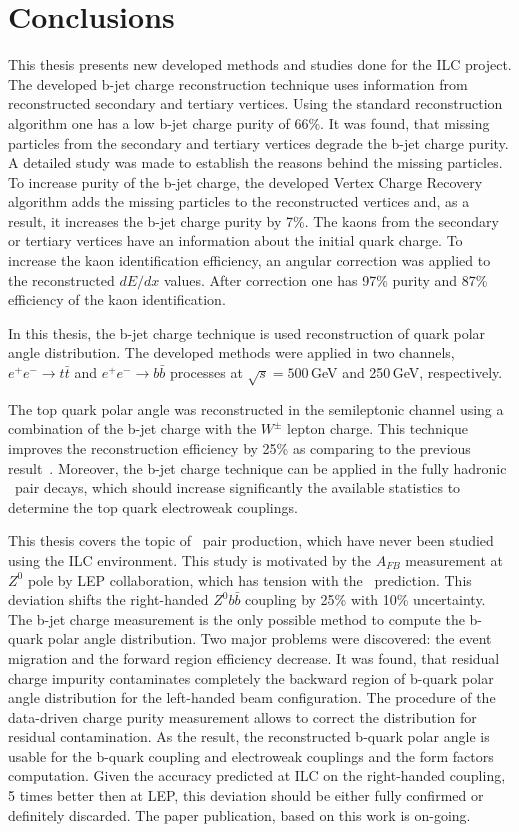 \section*{Conclusions}
This thesis presents new developed methods and studies done for the ILC project.
The developed b-jet charge reconstruction technique uses information from reconstructed secondary and tertiary vertices. 
Using the standard reconstruction algorithm one has a low b-jet charge purity of 66\%.
It was found, that missing particles from the secondary and tertiary vertices degrade the b-jet charge purity. 
A detailed study was made to establish the reasons behind the missing particles. 
To increase purity of the b-jet charge, the developed Vertex Charge Recovery algorithm adds the missing particles to the reconstructed vertices and, as a result, it increases the b-jet charge purity by 7\%.
The kaons from the secondary or tertiary vertices have an information about the initial quark charge. 
To increase the kaon identification efficiency, an angular correction was applied to the reconstructed $dE/dx$ values. 
After correction one has 97\% purity and 87\% efficiency of the kaon identification.

In this thesis, the b-jet charge technique is used reconstruction of quark polar angle distribution.
The developed methods were applied in two channels, $e^+e^-\to t\bar{t}$ and $e^+e^-\to b\bar{b}$ processes at $\sqrt{s} = 500$\,GeV and 250\,GeV, respectively.

The top quark polar angle was reconstructed in the semileptonic channel using a combination of the b-jet charge with the $W^\pm$ lepton charge. 
This technique improves the reconstruction efficiency by 25\% as comparing to the previous result~\cite{bib:ILCTOP}.
Moreover, the b-jet charge technique can be applied in the fully hadronic \ttbar\ pair decays, which should increase significantly the available statistics to determine the top quark electroweak couplings. 

This thesis covers the topic of \bbbar\ pair production, which have never been studied using the ILC environment. 
This study is motivated by the $A_{FB}$ measurement at $Z^0$ pole by LEP collaboration, which has tension with the \sm\ prediction.
This deviation shifts the right-handed $Z^0b\bar{b}$ coupling by 25\% with 10\% uncertainty.
The b-jet charge measurement is the only possible method to compute the b-quark polar angle distribution. 
Two major problems were discovered: the event migration and the forward region efficiency decrease. 
It was found, that residual charge impurity contaminates completely the backward region of b-quark polar angle distribution for the left-handed beam configuration.
The procedure of the data-driven charge purity measurement allows to correct the distribution for residual contamination. 
As the result, the reconstructed b-quark polar angle is usable for the b-quark coupling and electroweak couplings and the form factors computation. 
Given the accuracy predicted at ILC on the right-handed coupling, 5 times better then at LEP, this deviation should be either fully confirmed or definitely discarded. 
The paper publication, based on this work is on-going.


